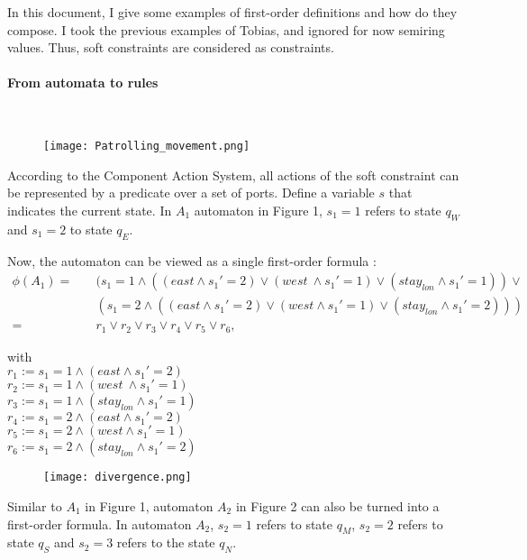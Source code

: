 \documentclass[runningheads]{llncs}
\begin{document}
In this document, I give some examples of first-order definitions and how do they compose. I took the previous examples of Tobias, and ignored for now semiring values. Thus, soft constraints are considered as constraints. 


\paragraph{From automata to rules} \hspace{0pt} \\

\begin{figure}[!h]
\centering
\texttt{[image: Patrolling\_movement.png]}
\end{figure}
\noindent
According to the Component Action System, all actions of the soft constraint can be represented by a predicate over a set of ports.
Define a variable $s$ that indicates the current state. In $A_1$ automaton in Figure 1, $s_1=1$ refers to state $q_W$ and $s_1=2$ to state $q_E$.

Now, the automaton can be viewed as a single first-order formula :
\begin{align*}
\phi(A_1) =  & \quad ( s_1=1 \land ((east\land s_1'=2) \lor (west\ \land s_1'=1) \lor (stay_{lon}\land s_1'=1)) \lor  \\
	&\quad(s_1=2 \land ((east \land s_1'=2) \lor (west \land s_1'= 1 )\lor (stay_{lon} \land s_1'=2))) \\
	  =  & \quad r_1 \lor r_2 \lor r_3 \lor r_4 \lor r_5 \lor r_6,
\end{align*}

\noindent
with\\ 
$r_1 := s_1=1 \land (east\land s_1'=2)$ \\ \quad
$r_2 := s_1=1 \land (west\ \land s_1'=1)$ \\ \quad
$r_3 := s_1=1 \land (stay_{lon}\land s_1'=1)$\\ \quad
$r_4 := s_1=2 \land (east \land s_1'=2)$ \\ \quad
$r_5 := s_1=2 \land (west \land s_1'= 1 )$\\ \quad
$r_6 := s_1=2 \land (stay_{lon} \land s_1'=2)$\\ \quad
\begin{figure}[!h]
\centering
\texttt{[image: divergence.png]}
\end{figure}

\noindent
Similar to $A_1$ in Figure 1, automaton $A_2$ in Figure 2 can also be turned into a first-order formula. In automaton $A_2$, $s_2=1$ refers to state $q_M$, $s_2=2$ refers to state $q_S$ and $s_2=3$ refers to the state $q_N$.
\end{document}
